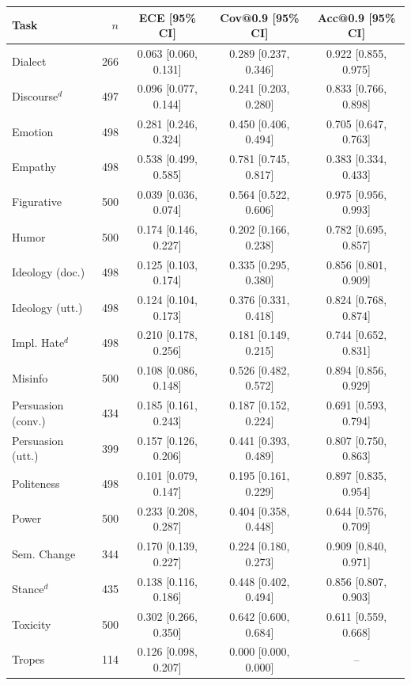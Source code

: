 \begin{tabular}{lrccc}
\toprule
Task & $n$ & ECE [95\% CI] & Cov@0.9 [95\% CI] & Acc@0.9 [95\% CI] \\
\midrule
Dialect & 266 & 0.063 [0.060, 0.131] & 0.289 [0.237, 0.346] & 0.922 [0.855, 0.975] \\
Discourse$^{d}$ & 497 & 0.096 [0.077, 0.144] & 0.241 [0.203, 0.280] & 0.833 [0.766, 0.898] \\
Emotion & 498 & 0.281 [0.246, 0.324] & 0.450 [0.406, 0.494] & 0.705 [0.647, 0.763] \\
Empathy & 498 & 0.538 [0.499, 0.585] & 0.781 [0.745, 0.817] & 0.383 [0.334, 0.433] \\
Figurative & 500 & 0.039 [0.036, 0.074] & 0.564 [0.522, 0.606] & 0.975 [0.956, 0.993] \\
Humor & 500 & 0.174 [0.146, 0.227] & 0.202 [0.166, 0.238] & 0.782 [0.695, 0.857] \\
Ideology (doc.) & 498 & 0.125 [0.103, 0.174] & 0.335 [0.295, 0.380] & 0.856 [0.801, 0.909] \\
Ideology (utt.) & 498 & 0.124 [0.104, 0.173] & 0.376 [0.331, 0.418] & 0.824 [0.768, 0.874] \\
Impl. Hate$^{d}$ & 498 & 0.210 [0.178, 0.256] & 0.181 [0.149, 0.215] & 0.744 [0.652, 0.831] \\
Misinfo & 500 & 0.108 [0.086, 0.148] & 0.526 [0.482, 0.572] & 0.894 [0.856, 0.929] \\
Persuasion (conv.) & 434 & 0.185 [0.161, 0.243] & 0.187 [0.152, 0.224] & 0.691 [0.593, 0.794] \\
Persuasion (utt.) & 399 & 0.157 [0.126, 0.206] & 0.441 [0.393, 0.489] & 0.807 [0.750, 0.863] \\
Politeness & 498 & 0.101 [0.079, 0.147] & 0.195 [0.161, 0.229] & 0.897 [0.835, 0.954] \\
Power & 500 & 0.233 [0.208, 0.287] & 0.404 [0.358, 0.448] & 0.644 [0.576, 0.709] \\
Sem. Change & 344 & 0.170 [0.139, 0.227] & 0.224 [0.180, 0.273] & 0.909 [0.840, 0.971] \\
Stance$^{d}$ & 435 & 0.138 [0.116, 0.186] & 0.448 [0.402, 0.494] & 0.856 [0.807, 0.903] \\
Toxicity & 500 & 0.302 [0.266, 0.350] & 0.642 [0.600, 0.684] & 0.611 [0.559, 0.668] \\
Tropes & 114 & 0.126 [0.098, 0.207] & 0.000 [0.000, 0.000] & -- \\
\bottomrule
\end{tabular}
